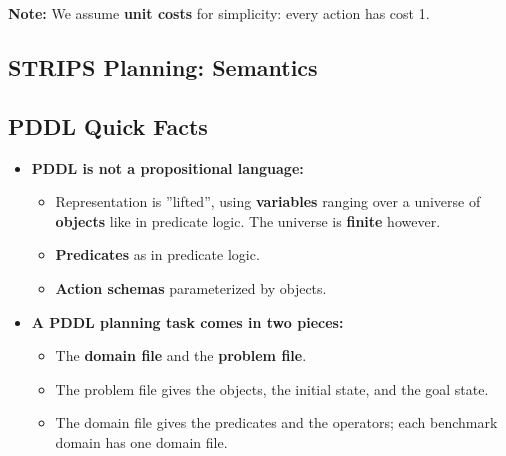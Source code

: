\documentclass[conference, a4paper]{styles/acmsiggraph}
\begin{document}
        \textbf{Note:} We assume \textbf{unit costs} for simplicity: every action has cost 1.
    
    \subsection{STRIPS Planning: Semantics}
    
    
    
    
    
    
    \subsection{PDDL Quick Facts}
        \begin{itemize}
            \item \textbf{PDDL is not a propositional language:}
            \begin{itemize}
                \item Representation is ''lifted'', using \textbf{variables} ranging over a universe of \textbf{objects} like in predicate logic. The universe is \textbf{finite} however.
                \item \textbf{Predicates} as in predicate logic.
                \item \textbf{Action schemas} parameterized by objects.
            \end{itemize}
            \item \textbf{A PDDL planning task comes in two pieces:}
            \begin{itemize}
                \item The \textbf{domain file} and the \textbf{problem file}.
                \item The problem file gives the objects, the initial state, and the goal state.
                \item The domain file gives the predicates and the operators; each benchmark domain has one domain file.
            \end{itemize}
        \end{itemize}
    
\end{document}
